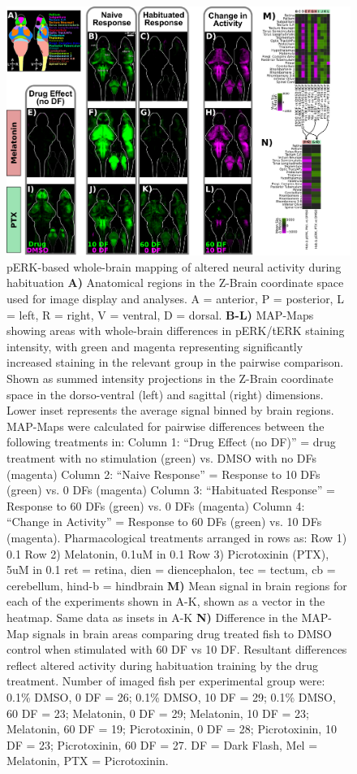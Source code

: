 \documentclass[9pt,lineno]{RandlettLab_elife}
\begin{document}
\begin{figure}
\begin{fullwidth}
\begin{center}
\includegraphics[width=0.93\linewidth]{Figure4-pERKResults.png}
\caption{
pERK-based whole-brain mapping of altered neural activity during habituation
\textbf{A)} Anatomical regions in the Z-Brain coordinate space used for image display and analyses. A = anterior, P = posterior, L = left, R = right, V = ventral, D = dorsal. 
\textbf{B-L)} MAP-Maps showing areas with whole-brain differences in pERK/tERK staining intensity, with green and magenta representing significantly increased staining in the relevant group in the pairwise comparison. Shown as summed intensity projections in the Z-Brain coordinate space in the dorso-ventral (left) and sagittal (right) dimensions. Lower inset represents the average signal binned by brain regions. MAP-Maps were calculated for pairwise differences between the following treatments in:
Column 1: “Drug Effect (no DF)” = drug treatment with no stimulation (green) vs. DMSO with no DFs (magenta)
Column 2: “Naive Response” = Response to 10 DFs (green) vs. 0 DFs (magenta)
Column 3: “Habituated Response” = Response to 60 DFs (green) vs. 0 DFs (magenta)
Column 4:  “Change in Activity” = Response to 60 DFs (green) vs. 10 DFs (magenta). 
Pharmacological treatments arranged in rows as: 
Row 1) 0.1%
Row 2) Melatonin, 0.1uM in 0.1%
Row 3)  Picrotoxinin (PTX), 5uM in 0.1%
ret = retina, dien = diencephalon, tec = tectum, cb = cerebellum, hind-b = hindbrain
\textbf{M)} Mean signal in brain regions for each of the experiments shown in A-K, shown as a vector in the heatmap. Same data as insets in A-K
\textbf{N)} Difference in the MAP-Map signals in brain areas comparing drug treated fish to DMSO control when stimulated with 60 DF vs 10 DF. Resultant differences reflect altered activity during habituation training by the drug treatment. 
Number of imaged fish per experimental group were: 0.1\% DMSO, 0 DF = 26; 0.1\% DMSO, 10 DF = 29; 0.1\% DMSO, 60 DF = 23; Melatonin, 0 DF = 29; Melatonin, 10 DF = 23; Melatonin, 60 DF = 19; Picrotoxinin, 0 DF = 28; Picrotoxinin, 10 DF = 23; Picrotoxinin, 60 DF = 27.
DF = Dark Flash, Mel = Melatonin, PTX = Picrotoxinin. }
\label{fig:4}
\end{center}
\end{fullwidth}
\end{figure}
\end{document}
